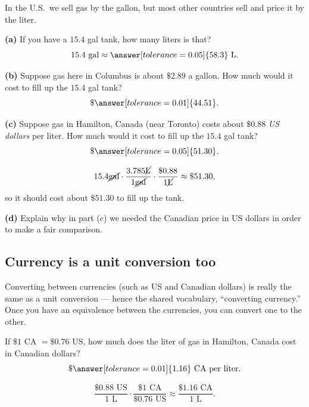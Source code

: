 \documentclass[12pt]{ximera}
\begin{document}
\begin{problem}
In the U.S.\ we sell gas by the gallon, but most other countries sell and price it by
the liter.

\begin{prompt}
\textbf{(a)} If you have a $15.4$ gal tank, how many liters is that?
\[
15.4 \text{ gal} \approx \answer[tolerance=0.05]{58.3} \text{ L}.
\]
\end{prompt}

\begin{prompt}
\textbf{(b)} Suppose gas here in Columbus is about $\$2.89$ a gallon. How much would
it cost to fill up the $15.4$ gal tank?
\[
\$\answer[tolerance=0.01]{44.51}.
\]
\end{prompt}

\begin{prompt}
\textbf{(c)} Suppose gas in Hamilton, Canada (near Toronto) costs about $\$0.88$
\emph{US dollars} per liter. How much would it cost to fill up the $15.4$ gal tank?
\[
\$\answer[tolerance=0.05]{51.30}.
\]
\end{prompt}

\begin{solution}
\[
15.4 \cancel{\text{gal}} \cdot \frac{3.785 \cancel{\text{L}}}{1 \cancel{\text{gal}}}
\cdot \frac{\$0.88}{1 \cancel{\text{L}}} \approx \$51.30,
\]
so it should cost about $\$51.30$ to fill up the tank.
\end{solution}

\begin{prompt}
\textbf{(d)} Explain why in part (c) we needed the Canadian price in US dollars in
order to make a fair comparison.
\begin{freeResponse}
\end{freeResponse}
\end{prompt}
\end{problem}

\subsection*{Currency is a unit conversion too}

Converting between currencies (such as US and Canadian dollars) is really the same as
a unit conversion --- hence the shared vocabulary, ``converting currency.'' Once you
have an equivalence between the currencies, you can convert one to the other.

\begin{problem}
If $\$1$ CA $= \$0.76$ US, how much does the liter of gas in Hamilton, Canada cost in
Canadian dollars?
\[
\$\answer[tolerance=0.01]{1.16} \text{ CA per liter}.
\]

\begin{solution}
\[
\frac{\$0.88 \text{ US}}{1 \text{ L}} \cdot
\frac{\$1 \text{ CA}}{\$0.76 \text{ US}} \approx \frac{\$1.16 \text{ CA}}{1 \text{ L}}.
\]
\end{solution}
\end{problem}
\end{document}
